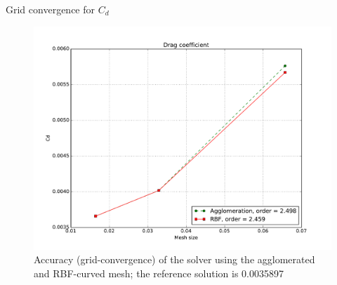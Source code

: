 \documentclass[t,12pt]{beamer}
\begin{document}
\begin{frame}{Grid convergence for $C_d$}
\begin{figure}
	\centering
	\includegraphics[scale=0.27]{cd_grid_conv}
	\caption{Accuracy (grid-convergence) of the solver using the agglomerated and RBF-curved mesh; the reference solution \cite{case:bump3d} is 0.0035897}
	\label{fig:gridconvergence}
\end{figure}
\end{frame}
\end{document}
